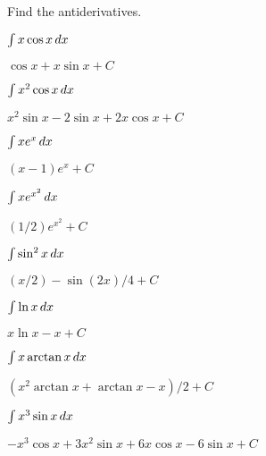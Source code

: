 \begin{exercises}

Find the antiderivatives.

\twocol

\begin{exercise} $\int x\cos x\, d x$
\begin{answer} $\cos x+x\sin x+C$
\end{answer}\end{exercise}

\begin{exercise} $\int x^2\cos x\, d x$
\begin{answer} $x^2\sin x-2 \sin x+2x\cos x +C$
\end{answer}\end{exercise}

\begin{exercise} $\int xe^x\, d x$
\begin{answer} $(x-1)e^x +C$
\end{answer}\end{exercise}

\begin{exercise} $\int xe^{x^2}\, d x$
\begin{answer} $(1/2)e^{x^2} +C$
\end{answer}\end{exercise}

\begin{exercise} $\int \sin^2 x\, d x$
\begin{answer} $(x/2)-\sin(2x)/4 +C$
\end{answer}\end{exercise}

\begin{exercise} $\int \ln x\, d x$
\begin{answer} $x\ln x-x +C$
\end{answer}\end{exercise}

\begin{exercise} $\int x\arctan x\, d x$
\begin{answer} $(x^2\arctan x +\arctan x -x)/2+C$
\end{answer}\end{exercise}

\begin{exercise} $\int x^3\sin x\, d x$
\begin{answer} $-x^3\cos x+3x^2\sin x+6x\cos x-6\sin x+C$
\end{answer}\end{exercise}


\end{exercises}
